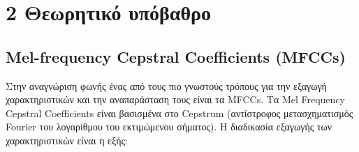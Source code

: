 \documentclass[a4paper, 12pt]{article}
\begin{document}
\section*{2 Θεωρητικό υπόβαθρο}

    \subsection*{Mel-frequency Cepstral Coefficients (MFCCs)}
    
    Στην αναγνώριση φωνής ένας από τους πιο γνωστούς τρόπους για την εξαγωγή χαρακτηριστικών και την αναπαράσταση τους είναι τα MFCCs. Τα Mel Frequency Cepstral Coefficients είναι βασισμένα στο Cepstrum (αντίστροφος μετασχηματισμός Fourier του λογαρίθμου του εκτιμώμενου σήματος). Η διαδικασία εξαγωγής των χαρακτηριστικών είναι η εξής:
    
\end{document}
